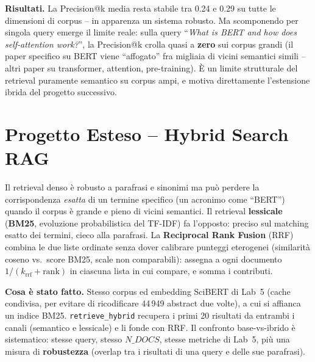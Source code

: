 \documentclass[11pt,a4paper]{article}
\begin{document}
\textbf{Risultati.} La Precision@k media resta stabile tra 0.24 e 0.29 su tutte le dimensioni di corpus -- in apparenza un sistema robusto. Ma scomponendo per singola query emerge il limite reale: sulla query ``\textit{What is BERT and how does self-attention work?}'', la Precision@k crolla quasi a \textbf{zero} sui corpus grandi (il paper specifico su BERT viene ``affogato'' fra migliaia di vicini semantici simili -- altri paper su transformer, attention, pre-training). È un limite strutturale del retrieval puramente semantico su corpus ampi, e motiva direttamente l'estensione ibrida del progetto successivo.

\section{Progetto Esteso -- Hybrid Search RAG}

\begin{theorybox}
Il retrieval denso è robusto a parafrasi e sinonimi ma può perdere la corrispondenza \emph{esatta} di un termine specifico (un acronimo come ``BERT'') quando il corpus è grande e pieno di vicini semantici. Il retrieval \textbf{lessicale} (\textbf{BM25}, evoluzione probabilistica del TF-IDF) fa l'opposto: preciso sul matching esatto dei termini, cieco alla parafrasi. La \textbf{Reciprocal Rank Fusion} (RRF) combina le due liste ordinate senza dover calibrare punteggi eterogenei (similarità coseno vs.\ score BM25, scale non comparabili): assegna a ogni documento $1/(k_{\text{rrf}}+\text{rank})$ in ciascuna lista in cui compare, e somma i contributi.
\end{theorybox}

\textbf{Cosa è stato fatto.} Stesso corpus ed embedding SciBERT di Lab~5 (cache condivisa, per evitare di ricodificare 44\,949 abstract due volte), a cui si affianca un indice BM25. \texttt{retrieve\_hybrid} recupera i primi 20 risultati da entrambi i canali (semantico e lessicale) e li fonde con RRF. Il confronto base-vs-ibrido è sistematico: stesse query, stesso $N\_DOCS$, stesse metriche di Lab~5, più una misura di \textbf{robustezza} (overlap tra i risultati di una query e delle sue parafrasi).
\end{document}
